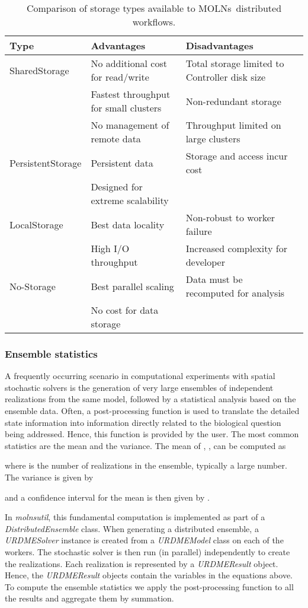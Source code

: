 \documentclass[final,leqno,onefignum,onetabnum]{siamltex1213}
\def\packagename {MOLNs}
\begin{document}
\begin{table*}[t]
\begin{tabular}{|l|l|l|l|}
\hline
{\bf Type} & {\bf Advantages} & {\bf Disadvantages}\\
\hline
SharedStorage  &  No additional cost for read/write & Total storage limited to Controller disk size\\
& Fastest throughput for small clusters & Non-redundant storage\\
& No management of remote data & Throughput limited on large clusters \\
\hline
PersistentStorage   & Persistent data  & Storage and access incur cost\\
  &  Designed for extreme scalability  & \\
\hline
LocalStorage  & Best data locality & Non-robust to worker failure \\
  &   High I/O throughput & Increased complexity for developer\\
\hline
No-Storage  &  Best parallel scaling & Data must be recomputed for analysis\\
& No cost for data storage	& \\
\hline
\end{tabular}
\caption{Comparison of storage types available to \packagename~distributed workflows.}
\label{tab:storage}
\end{table*}

\subsubsection{Ensemble statistics}
\label{sec:statistics}
A frequently occurring scenario in computational experiments with spatial stochastic solvers is the generation of very large ensembles of independent realizations from the same model, followed by a statistical analysis based on the ensemble data. Often, a post-processing function is used to translate the detailed state information  into information directly related to the biological question being addressed. Hence, this function  is provided by the user. The most common statistics are the mean and the variance. The mean of , , can be computed as 

where  is the number of realizations in the ensemble, typically a large number. The variance is given by 

and a  confidence interval for the mean is then given by 
.


In \emph{molnsutil}, this fundamental computation is implemented as part of a \emph{DistributedEnsemble} class. When generating a distributed ensemble, a \emph{URDMESolver} instance is created from a \emph{URDMEModel} class on each of the workers. The stochastic solver is then run (in parallel) independently to create the  realizations. Each realization is represented by a \emph{URDMEResult} object. Hence, the  \emph{URDMEResult} objects contain the  variables in the equations above. To compute the ensemble statistics we apply the post-processing function to all the results and aggregate them by summation. 
\end{document}
